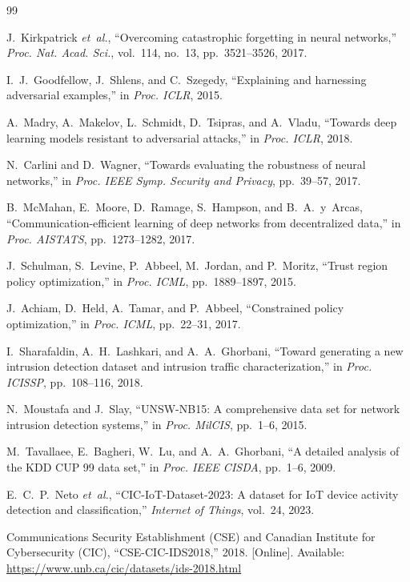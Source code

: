 \begin{thebibliography}{99}

J.~Kirkpatrick \emph{et~al.}, ``Overcoming catastrophic forgetting in neural networks,'' \emph{Proc. Nat. Acad. Sci.}, vol.~114, no.~13, pp.~3521--3526, 2017.

I.~J.~Goodfellow, J.~Shlens, and C.~Szegedy, ``Explaining and harnessing adversarial examples,'' in \emph{Proc. ICLR}, 2015.

A.~Madry, A.~Makelov, L.~Schmidt, D.~Tsipras, and A.~Vladu, ``Towards deep learning models resistant to adversarial attacks,'' in \emph{Proc. ICLR}, 2018.

N.~Carlini and D.~Wagner, ``Towards evaluating the robustness of neural networks,'' in \emph{Proc. IEEE Symp. Security and Privacy}, pp.~39--57, 2017.

B.~McMahan, E.~Moore, D.~Ramage, S.~Hampson, and B.~A.~y~Arcas, ``Communication-efficient learning of deep networks from decentralized data,'' in \emph{Proc. AISTATS}, pp.~1273--1282, 2017.

J.~Schulman, S.~Levine, P.~Abbeel, M.~Jordan, and P.~Moritz, ``Trust region policy optimization,'' in \emph{Proc. ICML}, pp.~1889--1897, 2015.

J.~Achiam, D.~Held, A.~Tamar, and P.~Abbeel, ``Constrained policy optimization,'' in \emph{Proc. ICML}, pp.~22--31, 2017.

I.~Sharafaldin, A.~H.~Lashkari, and A.~A.~Ghorbani, ``Toward generating a new intrusion detection dataset and intrusion traffic characterization,'' in \emph{Proc. ICISSP}, pp.~108--116, 2018.

N.~Moustafa and J.~Slay, ``UNSW-NB15: A comprehensive data set for network intrusion detection systems,'' in \emph{Proc. MilCIS}, pp.~1--6, 2015.

M.~Tavallaee, E.~Bagheri, W.~Lu, and A.~A.~Ghorbani, ``A detailed analysis of the KDD CUP 99 data set,'' in \emph{Proc. IEEE CISDA}, pp.~1--6, 2009.

E.~C.~P.~Neto \emph{et~al.}, ``CIC-IoT-Dataset-2023: A dataset for IoT device activity detection and classification,'' \emph{Internet of Things}, vol.~24, 2023.

Communications Security Establishment (CSE) and Canadian Institute for Cybersecurity (CIC), ``CSE-CIC-IDS2018,'' 2018. [Online]. Available: \url{https://www.unb.ca/cic/datasets/ids-2018.html}


\end{thebibliography}

